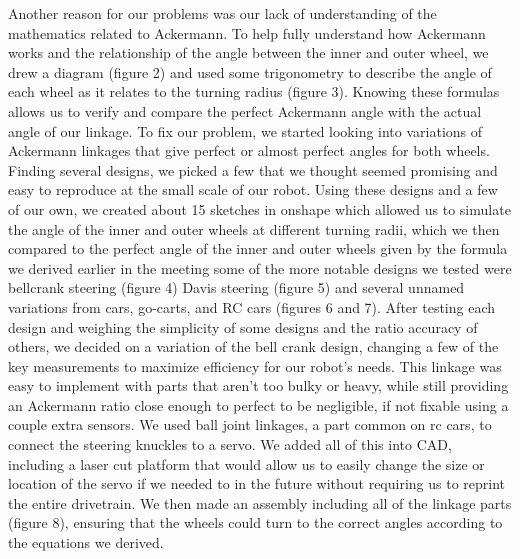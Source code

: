 Another reason for our problems was our lack of understanding of the mathematics related to Ackermann. To help fully understand how Ackermann works and the relationship of the angle between the inner and outer wheel, we drew a diagram (figure 2) and used some trigonometry to describe the angle of each wheel as it relates to the turning radius (figure 3). Knowing these formulas allows us to verify and compare the perfect Ackermann angle with the actual angle of our linkage.
To fix our problem, we started looking into variations of Ackermann linkages that give perfect or almost perfect angles for both wheels. Finding several designs, we picked a few that we thought seemed promising and easy to reproduce at the small scale of our robot. Using these designs and a few of our own, we created about 15 sketches in onshape which allowed us to simulate the angle of the inner and outer wheels at different turning radii, which we then compared to the perfect angle of the inner and outer wheels given by the formula we derived earlier in the meeting some of the more notable designs we tested were bellcrank steering (figure 4) Davis steering (figure 5) and several unnamed variations from cars, go-carts, and RC cars (figures 6 and 7). After testing each design and weighing the simplicity of some designs and the ratio accuracy of others, we decided on a variation of the bell crank design, changing a few of the key measurements to maximize efficiency for our robot’s needs. This linkage was easy to implement with parts that aren’t too bulky or heavy, while still providing an Ackermann ratio close enough to perfect to be negligible, if not fixable using a couple extra sensors. 
We used ball joint linkages, a part common on rc cars, to connect the steering knuckles to a servo. We added all of this into CAD, including a laser cut platform that would allow us to easily change the size or location of the servo if we needed to in the future without requiring us to reprint the entire drivetrain. We then made an assembly including all of the linkage parts (figure 8), ensuring that the wheels could turn to the correct angles according to the equations we derived. 


